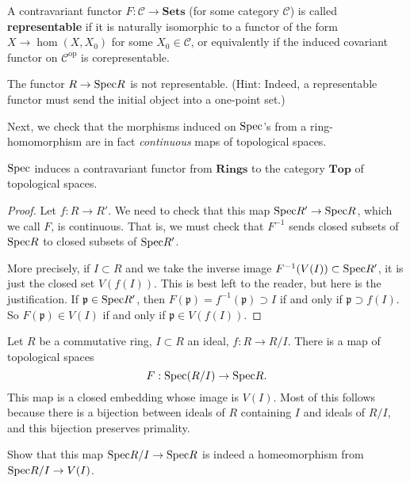 \begin{exercise} 
A contravariant functor $F: \mathcal{C} \to \mathbf{Sets}$ (for some category
$\mathcal{C}$) is called \textbf{representable} if it is naturally isomorphic
to a functor of the form $X \to \hom(X, X_0)$ for some $X_0 \in \mathcal{C}$,
or equivalently if the induced covariant functor on
$\mathcal{C}^{\mathrm{op}}$ is corepresentable. 

The functor $R \to \mathrm{Spec} R $ is not representable. (Hint: Indeed, a representable
functor must send the initial object into a one-point set.)
\end{exercise} 

Next, we check that the morphisms induced on $\mathrm{Spec}$'s from a
ring-homomorphism are in fact \emph{continuous} maps of topological spaces. 

\begin{proposition} 
$\mathrm{Spec} $ induces a contravariant functor from $\mathbf{Rings}$ to the category
$\mathbf{Top}$ of topological spaces.
\end{proposition} 
\begin{proof} Let $f : R \to R'$. 
We need to check that this map $ \mathrm{Spec} R' \to \mathrm{Spec} R$, which we call $F$, is
continuous.
That is, we must check that $F^{-1}$ sends closed
subsets of $\mathrm{Spec} R$ to closed subsets of $\mathrm{Spec} R'$.  

More precisely, if $I \subset
R$ and we take the inverse image $F^{-1}(V(I)) \subset \mathrm{Spec} R'$, it is just
the closed set $V(f(I))$.  This is best left to the reader, but here is the justification.  If $\mathfrak{p} \in \mathrm{Spec} R'$, then $F(\mathfrak{p}) = f^{-1}(\mathfrak{p})
\supset I$ if and only if $\mathfrak{p} \supset f(I)$. So $F(\mathfrak{p}) \in
V(I)$ if and only if $\mathfrak{p} \in V(f(I))$.

\end{proof} 



\begin{example} 
Let $R$ be a commutative ring, $I \subset R$ an ideal, $f: R \to R/I$. There is a map
of topological spaces
\[ F: \mathrm{Spec} (R/I) \to \mathrm{Spec} R  .\]
This map is a closed embedding whose image is $V(I)$.  Most of this follows because
there is a bijection between ideals of $R$ containing $I$ and
ideals of $R/I$, and this bijection preserves primality.

\begin{exercise} 
Show that this map $\mathrm{Spec} R/I \to \mathrm{Spec} R$ is indeed a homeomorphism from $\mathrm{Spec} R/I
\to V(I)$.  
\end{exercise} 
\end{example} 

